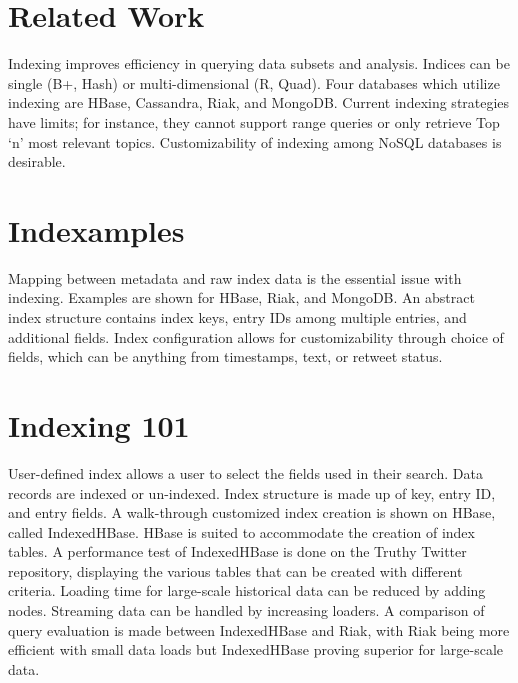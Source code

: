 
\section{Related Work}

Indexing improves efficiency in querying data subsets and analysis.
Indices can be single (B+, Hash) or multi-dimensional (R, Quad). Four
databases which utilize indexing are HBase, Cassandra, Riak, and
MongoDB. Current indexing strategies have limits; for instance, they
cannot support range queries or only retrieve Top `n' most relevant
topics. Customizability of indexing among NoSQL databases is desirable.



\section{Indexamples}

Mapping between metadata and raw index data is the essential issue with
indexing. Examples are shown for HBase, Riak, and MongoDB. An abstract
index structure contains index keys, entry IDs among multiple entries,
and additional fields. Index configuration allows for customizability
through choice of fields, which can be anything from timestamps, text,
or retweet status.



\section{Indexing 101}

User-defined index allows a user to select the fields used in their
search. Data records are indexed or un-indexed. Index structure is made
up of key, entry ID, and entry fields. A walk-through customized index
creation is shown on HBase, called IndexedHBase. HBase is suited to
accommodate the creation of index tables. A performance test of
IndexedHBase is done on the Truthy Twitter repository, displaying the
various tables that can be created with different criteria. Loading time
for large-scale historical data can be reduced by adding nodes.
Streaming data can be handled by increasing loaders. A comparison of
query evaluation is made between IndexedHBase and Riak, with Riak being
more efficient with small data loads but IndexedHBase proving superior
for large-scale data.

